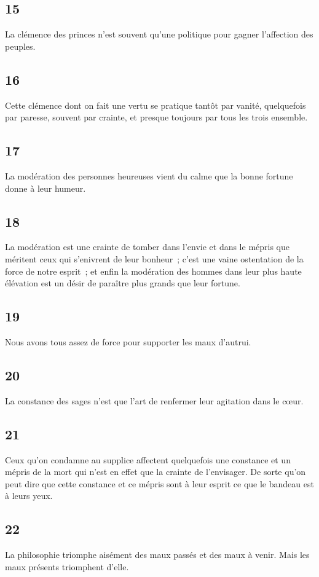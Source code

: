 \documentclass[french,twoside]{book} %
\begin{document}
\subsection[{15}]{ \textsc{15} }
\noindent La clémence des princes n’est souvent qu’une politique pour gagner l’affection des peuples.
\subsection[{16}]{ \textsc{16} }
\noindent Cette clémence dont on fait une vertu se pratique tantôt par vanité, quelquefois par paresse, souvent par crainte, et presque toujours par tous les trois ensemble.
\subsection[{17}]{ \textsc{17} }
\noindent La modération des personnes heureuses vient du calme que la bonne fortune donne à leur humeur.
\subsection[{18}]{ \textsc{18} }
\noindent La modération est une crainte de tomber dans l’envie et dans le mépris que méritent ceux qui s’enivrent de leur bonheur ; c’est une vaine ostentation de la force de notre esprit ; et enfin la modération des hommes dans leur plus haute élévation est un désir de paraître plus grands que leur fortune.
\subsection[{19}]{ \textsc{19} }
\noindent Nous avons tous assez de force pour supporter les maux d’autrui.
\subsection[{20}]{ \textsc{20} }
\noindent La constance des sages n’est que l’art de renfermer leur agitation dans le cœur.
\subsection[{21}]{ \textsc{21} }
\noindent Ceux qu’on condamne au supplice affectent quelquefois une constance et un mépris de la mort qui n’est en effet que la crainte de l’envisager. De sorte qu’on peut dire que cette constance et ce mépris sont à leur esprit ce que le bandeau est à leurs yeux.
\subsection[{22}]{ \textsc{22} }
\noindent La philosophie triomphe aisément des maux passés et des maux à venir. Mais les maux présents triomphent d’elle.
\end{document}
